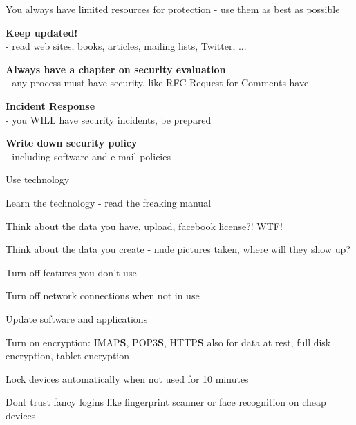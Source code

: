 \documentclass[Screen16to9,17pt]{foils}
\begin{document}


\begin{list1}
\item You always have limited resources for protection - use them as best as possible
\end{list1}




\begin{list1}
\item {\bf Keep updated!}\\ - read web sites, books, articles, mailing lists, Twitter, ...
\item {\bf Always have a chapter on security evaluation }\\ - any process must have security, like RFC Request for Comments have
\item {\bf Incident Response}\\ - you WILL have security incidents, be prepared
\item {\bf Write down security policy}\\ - including software and e-mail policies
\end{list1}


\begin{list1}
\item Use technology
\item Learn the technology - read the freaking manual
\item Think about the data you have, upload, facebook license?! WTF!
\item Think about the data you create - nude pictures taken, where will they show up?
\begin{list2}
\item Turn off features you don't use
\item Turn off network connections when not in use
\item Update software and applications
\item Turn on encryption: IMAP{\bf S}, POP3{\bf S},
  HTTP{\bf S} also for data at rest, full disk encryption, tablet encryption
\item Lock devices automatically when not used for 10 minutes
\item Dont trust fancy logins like fingerprint scanner or face recognition on cheap devices
\end{list2}
\end{list1}
\end{document}

